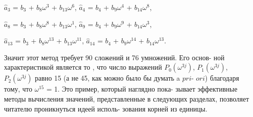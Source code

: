 \begin{center}
\vspace{10pt}
$\hat a_3$ \hspace{6pt}=\hspace{1pt} $b_3$ +\hspace{1pt} $b_8\omega^3$ \hspace{8pt}+ $b_{13}\omega^{6}$, \hspace{25pt} $\hat a_4$ \hspace{9pt}= $b_4$ \hspace{3pt}+ $b_9\omega^4$ \hspace{4pt}+ $b_{14}\omega^{8}$, \ 

\vspace{1pt}
$\hat a_8$ \hspace{6pt}=\hspace{1pt} $b_3$ +\hspace{1pt} $b_8\omega^8$ \hspace{8pt}+ $b_{13}\omega^{1}$, \hspace{25pt} $\hat a_9$ \hspace{9pt}= $b_4$ \hspace{3pt}+ $b_9\omega^9$ \hspace{4pt}+ $b_{14}\omega^{3}$, \ 

\vspace{1pt}
\hspace{0pt} $\hat a_{13}$ \hspace{3pt}=\hspace{1pt} $b_3$ +\hspace{1pt} $b_8\omega^{13}$ \hspace{4pt}+ $b_{13}\omega^{11}$, \hspace{20pt} $\hat a_{14}$ \hspace{6pt}= $b_4$ \hspace{3pt}+ $b_9\omega^{14}$ \hspace{1pt}+ $b_{14}\omega^{13}$\hspace{1pt}.
\end{center}

Значит этот метод требует 90 сложений и 76 умножений. Его основ­- \linebreak
ной характеристикой является то , что число выражений $P_0(\omega^{3j})$, \linebreak
$P_1(\omega^{3j})$, $P_2(\omega^{3j})$ равно 15 (а не 45, как можно было бы думать a $pri$- \linebreak
$ori$) благодаря тому, что $\omega^15$ = 1. Это пример, который наглядно пока­- \linebreak
зывает эффективные методы вычисления значений, представленные в \linebreak
следующих разделах, позволяет читателю проникнуться идеей исполь­- \linebreak
зования корней из единицы. \ 

